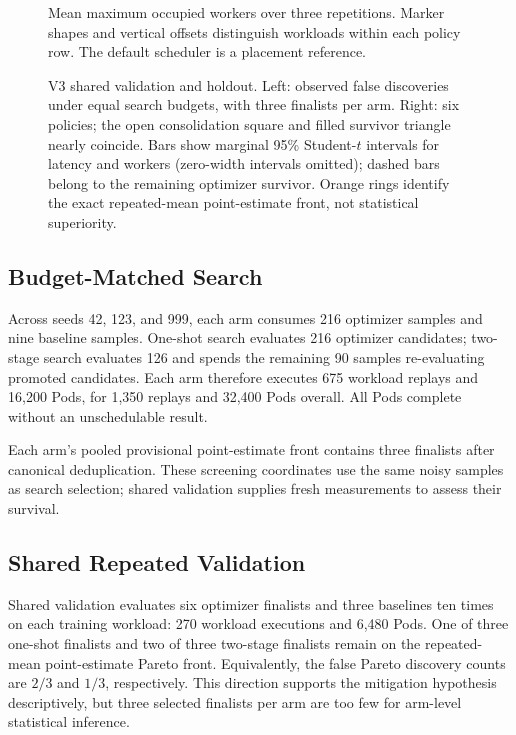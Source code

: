 \documentclass[conference]{IEEEtran}
\begin{document}
\begin{figure}[t]
\centering

\caption{Mean maximum occupied workers over three repetitions. Marker shapes and vertical offsets distinguish workloads within each policy row. The default scheduler is a placement reference.}
\label{fig:baseline-placement}
\end{figure}

\begin{figure}[t]
\centering
\resizebox{0.94\textwidth}{!}{}
\caption{V3 shared validation and holdout. Left: observed false discoveries under equal search budgets, with three finalists per arm. Right: six policies; the open consolidation square and filled survivor triangle nearly coincide. Bars show marginal 95\% Student-$t$ intervals for latency and workers (zero-width intervals omitted); dashed bars belong to the remaining optimizer survivor. Orange rings identify the exact repeated-mean point-estimate front, not statistical superiority.}
\label{fig:v3-mitigation-holdout}
\end{figure}

\subsection{Budget-Matched Search}
Across seeds 42, 123, and 999, each arm consumes 216 optimizer samples and nine baseline samples. One-shot search evaluates 216 optimizer candidates; two-stage search evaluates 126 and spends the remaining 90 samples re-evaluating promoted candidates. Each arm therefore executes 675 workload replays and 16,200 Pods, for 1,350 replays and 32,400 Pods overall. All Pods complete without an unschedulable result.

Each arm's pooled provisional point-estimate front contains three finalists after canonical deduplication. These screening coordinates use the same noisy samples as search selection; shared validation supplies fresh measurements to assess their survival.

\subsection{Shared Repeated Validation}
Shared validation evaluates six optimizer finalists and three baselines ten times on each training workload: 270 workload executions and 6,480 Pods. One of three one-shot finalists and two of three two-stage finalists remain on the repeated-mean point-estimate Pareto front. Equivalently, the false Pareto discovery counts are $2/3$ and $1/3$, respectively. This direction supports the mitigation hypothesis descriptively, but three selected finalists per arm are too few for arm-level statistical inference.
\end{document}
